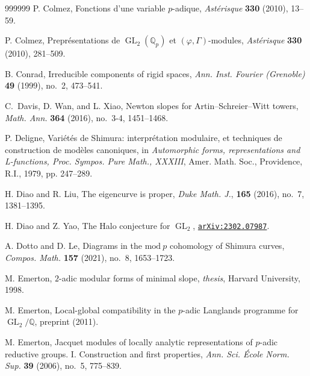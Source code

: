 \documentclass[12pt]{amsart}
\theoremstyle{definition}
\numberwithin{equation}{subsection}
\def\QQ{\mathbb{Q}}
\DeclareMathOperator{\GL}{GL}
\begin{document}
\begin{thebibliography}{999999}
P. Colmez,
Fonctions d'une variable $p$-adique, {\it Ast\'erisque} {\bf 330} (2010), 13--59.

P. Colmez,
Prepr\'esentations de $\GL_2(\QQ_p)$ et $(\varphi, \Gamma)$-modules, {\it Ast\'erisque}  {\bf 330} (2010), 281--509.


B. Conrad, Irreducible components of rigid spaces, {\it Ann. Inst. Fourier (Grenoble)} {\bf 49} (1999), no.~2, 473--541.

C.~Davis, D. Wan, and L. Xiao, Newton slopes for Artin--Schreier--Witt towers, {\it Math. Ann.} {\bf 364} (2016), no.~3-4, 1451--1468.

P. Deligne, Vari\'et\'es de Shimura: interpr\'etation modulaire, et techniques de construction de mod\`eles
canoniques, in {\it Automorphic forms, representations and L-functions, Proc. Sympos. Pure Math., XXXIII},
Amer. Math. Soc., Providence, R.I., 1979, pp. 247--289.


H. Diao and R. Liu,
The eigencurve is proper, {\it Duke Math. J.}, {\bf 165} (2016), no.~7, 1381--1395.

H. Diao and Z. Yao, The Halo conjecture for $\GL_2$, \href{https://arxiv.org/abs/2302.07987}{{\tt	arXiv:2302.07987}}.


A. Dotto and D. Le,
Diagrams in the $\mathrm{mod}\ p$ cohomology of Shimura curves, {\it 
Compos. Math.} {\bf 157} (2021), no.~8, 1653--1723.

M. Emerton,
$2$-adic modular forms of minimal slope, {\it thesis}, Harvard University, 1998.

M. Emerton,
Local-global compatibility in the $p$-adic Langlands programme for $\GL_2/\QQ$, preprint (2011).

M. Emerton, Jacquet modules of locally analytic representations of $p$-adic reductive groups. I. Construction and first properties, {\it Ann. Sci. \'Ecole Norm. Sup.} {\bf 39} (2006), no.~5, 775--839.


\end{thebibliography}
\end{document}
